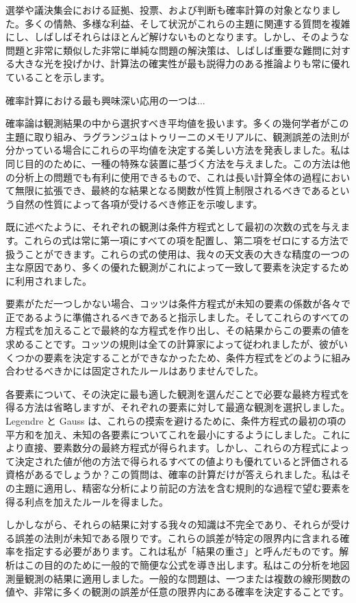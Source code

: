 \documentclass[a4paper,11pt,openany]{ltjsbook}
\begin{document}
選挙や議決集会における証拠、投票、および判断も確率計算の対象となりました。多くの情熱、多様な利益、そして状況がこれらの主題に関連する質問を複雑にし、しばしばそれらはほとんど解けないものとなります。しかし、そのような問題と非常に類似した非常に単純な問題の解決策は、しばしば重要な難問に対する大きな光を投げかけ、計算法の確実性が最も説得力のある推論よりも常に優れていることを示します。

確率計算における最も興味深い応用の一つは...

確率論は観測結果の中から選択すべき平均値を扱います。多くの幾何学者がこの主題に取り組み、ラグランジュはトゥリーニのメモリアルに、観測誤差の法則が分かっている場合にこれらの平均値を決定する美しい方法を発表しました。私は同じ目的のために、一種の特殊な装置に基づく方法を与えました。この方法は他の分析上の問題でも有利に使用できるもので、これは長い計算全体の過程において無限に拡張でき、最終的な結果となる関数が性質上制限されるべきであるという自然の性質によって各項が受けるべき修正を示唆します。

既に述べたように、それぞれの観測は条件方程式として最初の次数の式を与えます。これらの式は常に第一項にすべての項を配置し、第二項をゼロにする方法で扱うことができます。これらの式の使用は、我々の天文表の大きな精度の一つの主な原因であり、多くの優れた観測がこれによって一致して要素を決定するために利用されました。

要素がただ一つしかない場合、コッツは条件方程式が未知の要素の係数が各々で正であるように準備されるべきであると指示しました。そしてこれらのすべての方程式を加えることで最終的な方程式を作り出し、その結果からこの要素の値を求めることです。コッツの規則は全ての計算家によって従われましたが、彼がいくつかの要素を決定することができなかったため、条件方程式をどのように組み合わせるべきかには固定されたルールはありませんでした。

各要素について、その決定に最も適した観測を選んだことで必要な最終方程式を得る方法は省略しますが、それぞれの要素に対して最適な観測を選択しました。 Legendre と Gauss は、これらの摸索を避けるために、条件方程式の最初の項の平方和を加え、未知の各要素についてこれを最小にするようにしました。これにより直接、要素数分の最終方程式が得られます。しかし、これらの方程式によって決定された値が他の方法で得られるすべての値よりも優れていると評価される資格があるでしょうか？この質問は、確率の計算だけが答えられました。私はその主題に適用し、精密な分析により前記の方法を含む規則的な過程で望む要素を得る利点を加えたルールを得ました。

しかしながら、それらの結果に対する我々の知識は不完全であり、それらが受ける誤差の法則が未知である限りです。これらの誤差が特定の限界内に含まれる確率を指定する必要があります。これは私が「結果の重さ」と呼んだものです。解析はこの目的のために一般的で簡便な公式を導き出します。私はこの分析を地図測量観測の結果に適用しました。一般的な問題は、一つまたは複数の線形関数の値や、非常に多くの観測の誤差が任意の限界内にある確率を決定することです。
\end{document}
